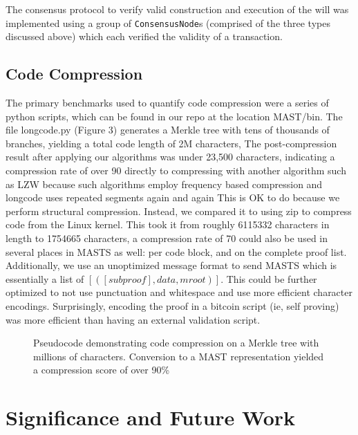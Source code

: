 \documentclass{vldb}
\begin{document}
The consensus protocol to verify valid construction and execution of the will
was implemented using a group of \texttt{ConsensusNode}s (comprised of the three types
discussed above) which each verified the validity of a transaction.

\subsection{Code Compression}

The primary benchmarks used to quantify code compression were a series of
python scripts, which can be found in our repo at the location MAST/bin. The
file longcode.py (Figure 3) generates a Merkle tree with tens of thousands of
branches, yielding a total code length of 2M characters, The post-compression
result after applying our algorithms was under 23,500 characters, indicating a
compression rate of over 90%
directly to compressing with another algorithm such as LZW because such
algorithms employ frequency based compression and longcode uses repeated
segments again and again This is OK to do because we perform structural
compression. Instead, we compared it to using zip to compress code from the Linux kernel.
This took it from roughly 6115332 characters in length to 1754665 characters, a
compression rate of 70%
could also be used in several places in MASTS as well: per code block, and on
the complete proof list. Additionally, we use an unoptimized message format to send
MASTS which is essentially a list of $[([subproof],data, mroot) ]$. This could be
further optimized to not use punctuation and whitespace and use more
efficient character encodings. Surprisingly, encoding the proof in a bitcoin
script (ie, self proving) was more efficient than having an external validation
script.

\begin{figure}[t!]
	
	\caption{Pseudocode demonstrating code compression on a Merkle tree with millions of characters. Conversion to a MAST representation yielded a compression score of over 90\%}
           \label{code}
\end{figure}

\section{Significance and Future Work}
\end{document}

